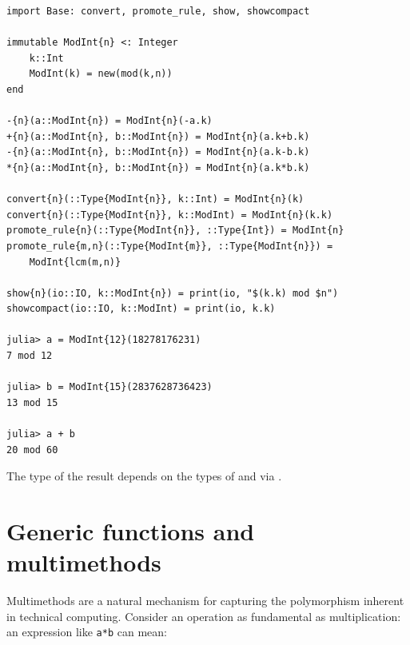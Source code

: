 \documentclass[pldi]{sigplanconf-pldi15}
\begin{document}
\begin{verbatim}
import Base: convert, promote_rule, show, showcompact

immutable ModInt{n} <: Integer
    k::Int
    ModInt(k) = new(mod(k,n))
end

-{n}(a::ModInt{n}) = ModInt{n}(-a.k)
+{n}(a::ModInt{n}, b::ModInt{n}) = ModInt{n}(a.k+b.k)
-{n}(a::ModInt{n}, b::ModInt{n}) = ModInt{n}(a.k-b.k)
*{n}(a::ModInt{n}, b::ModInt{n}) = ModInt{n}(a.k*b.k)

convert{n}(::Type{ModInt{n}}, k::Int) = ModInt{n}(k)
convert{n}(::Type{ModInt{n}}, k::ModInt) = ModInt{n}(k.k)
promote_rule{n}(::Type{ModInt{n}}, ::Type{Int}) = ModInt{n}
promote_rule{m,n}(::Type{ModInt{m}}, ::Type{ModInt{n}}) =
    ModInt{lcm(m,n)}

show{n}(io::IO, k::ModInt{n}) = print(io, "$(k.k) mod $n")
showcompact(io::IO, k::ModInt) = print(io, k.k)

julia> a = ModInt{12}(18278176231)
7 mod 12

julia> b = ModInt{15}(2837628736423)
13 mod 15

julia> a + b
20 mod 60
\end{verbatim}

The type of the result  depends on the types of  and  via .





\section{Generic functions and multimethods}

Multimethods are a natural mechanism for capturing the polymorphism
inherent in technical computing. Consider an operation as fundamental as
multiplication: an expression like \verb|a*b| can mean:
\end{document}
